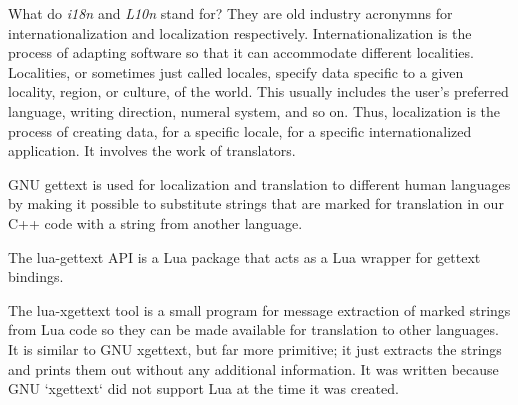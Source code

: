 

What do {\it i18n} and {\it L10n} stand for? They are old industry acronymns for internationalization and localization respectively. Internationalization is the process of adapting software so that it can accommodate different localities. Localities, or sometimes just called locales, specify data specific to a given locality, region, or culture, of the world. This usually includes the user's preferred language, writing direction, numeral system, and so on. Thus, localization is the process of creating data, for a specific locale, for a specific internationalized application. It involves the work of translators.

\startitemize[4]

GNU gettext is used for localization and translation to different human languages by making it possible to substitute strings that are marked for translation in our C++ code with a string from another language.


The lua-gettext API is a Lua package that acts as a Lua wrapper for gettext bindings.


The lua-xgettext tool is a small program for message extraction of marked strings from Lua code so they can be made available for translation to other languages. It is similar to GNU xgettext, but far more primitive; it just extracts the strings and prints them out without any additional information. It was written because GNU `xgettext` did not support Lua at the time it was created.
\stopitemize

